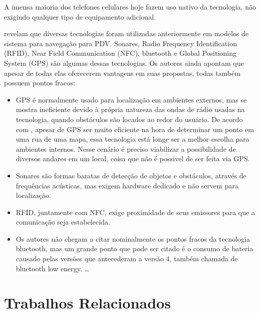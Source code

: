 \documentclass[english,brazilian]{UNISINOSmonografia}
\begin{document}
A imensa maioria dos telefones celulares hoje fazem uso nativo da tecnologia, não exigindo qualquer tipo de equipamento adicional.







 revelam que diversas tecnologias foram utilizadas anteriormente em modelos de sistema para navegação para PDV. Sonares, Radio Frequency Identification (RFID), Near Field Communication (NFC), bluetooth e Global Positioning System (GPS) são algumas dessas tecnologias. Os autores ainda apontam que apesar de todas elas oferecerem vantagens em suas propostas, todas também possuem pontos fracos:

\begin{itemize}
  \item GPS é normalmente usado para localização em ambientes externos, mas se mostra ineficiente devido à própria natureza das ondas de rádio usadas na tecnologia, quando obstáculos são locados ao redor do usuário. De acordo com , apesar de GPS ser muito eficiente na hora de determinar um ponto em uma rua de uma mapa, essa tecnologia está longe ser a melhor escolha para ambientes internos. Nesse cenário é preciso viabilizar a possibilidade de diversos andares em um local, coisa que não é possivel de ser feita via GPS.
  \item Sonares são formas baratas de detecção de objetos e obstáculos, através de frequências acústicas, mas exigem hardware dedicado e não servem para localização.
  \item RFID, juntamente com NFC, exige proximidade de seus emissores para que a comunicação seja estabelecida.
  \item Os autores não chegam a citar nominalmente os pontos fracos da tecnologia bluetooth, mas um grande ponto que pode ser citado é o consumo de bateria causado pelas versões que antecederam a versão 4, também chamada de bluetooth low energy.    \ldots
\end{itemize}

\chapter{Trabalhos Relacionados}
\end{document}
